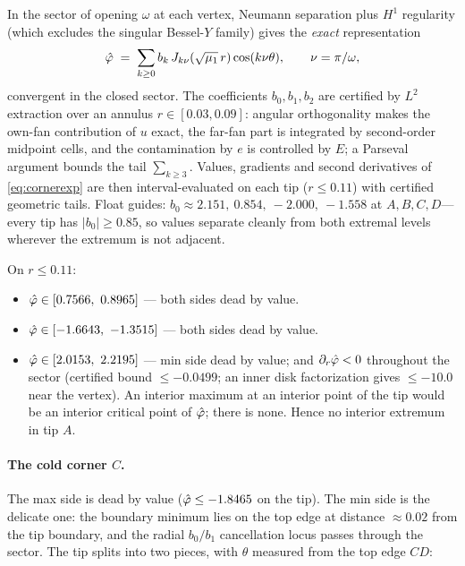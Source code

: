 \documentclass[11pt]{article}
\begin{document}
In the sector of opening $\omega$ at each vertex, Neumann separation
plus $H^1$ regularity (which excludes the singular Bessel-$Y$ family)
gives the \emph{exact} representation
\begin{equation}\label{eq:cornerexp}
\hat\varphi \;=\; \sum_{k\ge0} b_k\,J_{k\nu}(\sqrt{\mu_1}\,r)\cos(k\nu\theta),
\qquad \nu=\pi/\omega,
\end{equation}
convergent in the closed sector. The coefficients $b_0,b_1,b_2$ are
certified by $L^2$ extraction over an annulus $r\in[0.03,0.09]$:
angular orthogonality makes the own-fan contribution of $u$ exact, the
far-fan part is integrated by second-order midpoint cells, and the
contamination by $e$ is controlled by $E$; a Parseval argument bounds
the tail $\sum_{k\ge3}$. Values, gradients and second derivatives of
\eqref{eq:cornerexp} are then interval-evaluated on each tip
($r\le0.11$) with certified geometric tails. Float guides:
$b_0\approx 2.151,\ 0.854,\ -2.000,\ -1.558$ at $A,B,C,D$---every tip
has $|b_0|\ge0.85$, so values separate cleanly from both extremal
levels wherever the extremum is not adjacent.

\begin{lemma}[tips $A$, $B$, $D$]\label{lem:tipsABD}
On $r\le0.11$:
\begin{itemize}
\item[$B$:] $\hat\varphi\in[0.7566,\ 0.8965]$ --- both sides dead by value.
\item[$D$:] $\hat\varphi\in[-1.6643,\ -1.3515]$ --- both sides dead by value.
\item[$A$:] $\hat\varphi\in[2.0153,\ 2.2195]$ --- min side dead by value; and
$\partial_r\hat\varphi<0$ throughout the sector (certified bound
$\le-0.0499$; an inner disk factorization gives $\le-10.0$ near the
vertex). An interior maximum at an interior point of the tip would be
an interior critical point of $\hat\varphi$; there is none. Hence no interior
extremum in tip $A$.
\end{itemize}
\end{lemma}

\paragraph{The cold corner $C$.}
The max side is dead by value ($\hat\varphi\le-1.8465$ on the tip). The min
side is the delicate one: the boundary minimum lies on the top edge at
distance ${\approx}0.02$ from the tip boundary, and the radial
$b_0/b_1$ cancellation locus passes through the sector. The tip splits
into two pieces, with $\theta$ measured from the top edge $CD$:
\end{document}
